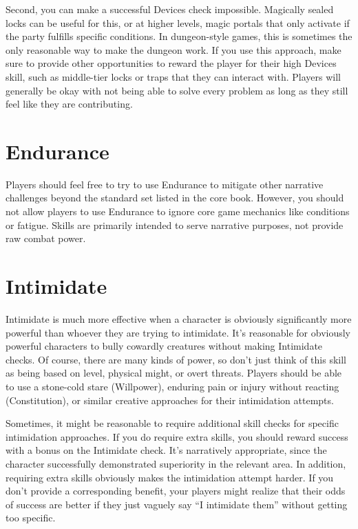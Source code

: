   Second, you can make a successful Devices check impossible.
  Magically sealed locks can be useful for this, or at higher levels, magic portals that only activate if the party fulfills specific conditions.
  In dungeon-style games, this is sometimes the only reasonable way to make the dungeon work.
  If you use this approach, make sure to provide other opportunities to reward the player for their high Devices skill, such as middle-tier locks or traps that they can interact with.
  Players will generally be okay with not being able to solve every problem as long as they still feel like they are contributing.

\section{Endurance}\label{Endurance}
  Players should feel free to try to use Endurance to mitigate other narrative challenges beyond the standard set listed in the core book.
  However, you should not allow players to use Endurance to ignore core game mechanics like conditions or fatigue.
  Skills are primarily intended to serve narrative purposes, not provide raw combat power.

\section{Intimidate}\label{Intimidate}

  Intimidate is much more effective when a character is obviously significantly more powerful than whoever they are trying to intimidate.
  It's reasonable for obviously powerful characters to bully cowardly creatures without making Intimidate checks.
  Of course, there are many kinds of power, so don't just think of this skill as being based on level, physical might, or overt threats.
  Players should be able to use a stone-cold stare (Willpower), enduring pain or injury without reacting (Constitution), or similar creative approaches for their intimidation attempts.

  Sometimes, it might be reasonable to require additional skill checks for specific intimidation approaches.
  If you do require extra skills, you should reward success with a bonus on the Intimidate check.
  It's narratively appropriate, since the character successfully demonstrated superiority in the relevant area.
  In addition, requiring extra skills obviously makes the intimidation attempt harder.
  If you don't provide a corresponding benefit, your players might realize that their odds of success are better if they just vaguely say ``I intimidate them'' without getting too specific.

